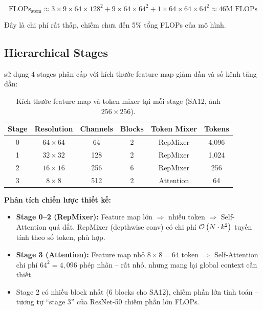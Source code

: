 \begin{equation}
    \text{FLOPs}_{\text{stem}} \approx 3 \times 9 \times 64 \times 128^2 + 9 \times 64 \times 64^2 + 1 \times 64 \times 64 \times 64^2 \approx 46\text{M FLOPs}
\end{equation}

\noindent Đây là chi phí rất thấp, chiếm chưa đến 5\% tổng FLOPs của mô hình.

\subsection{Hierarchical Stages}
\label{subsec:stages}

\fastvit{} sử dụng 4 stages phân cấp với kích thước feature map giảm dần và số kênh tăng dần:

\begin{table}[H]
\centering
\caption{Kích thước feature map và token mixer tại mỗi stage (SA12, ảnh $256 \times 256$).}
\label{tab:stage_detail}
\begin{tabular}{c c c c c c}
\toprule
\textbf{Stage} & \textbf{Resolution} & \textbf{Channels} & \textbf{Blocks} & \textbf{Token Mixer} & \textbf{Tokens} \\
\midrule
0 & $64 \times 64$ & 64 & 2 & RepMixer & 4{,}096 \\
1 & $32 \times 32$ & 128 & 2 & RepMixer & 1{,}024 \\
2 & $16 \times 16$ & 256 & 6 & RepMixer & 256 \\
3 & $8 \times 8$ & 512 & 2 & Attention & 64 \\
\bottomrule
\end{tabular}
\end{table}

\textbf{Phân tích chiến lược thiết kế:}
\begin{itemize}
    \item \textbf{Stage 0--2 (RepMixer):} Feature map lớn $\Rightarrow$ nhiều token $\Rightarrow$ Self-Attention quá đắt. RepMixer (depthwise conv) có chi phí $\mathcal{O}\left(N \cdot k^2\right)$ tuyến tính theo số token, phù hợp.
    
    \item \textbf{Stage 3 (Attention):} Feature map nhỏ $8 \times 8 = 64$ token $\Rightarrow$ Self-Attention chi phí $64^2 = 4{,}096$ phép nhân -- rất nhỏ, nhưng mang lại global context cần thiết.
    
    \item Stage 2 có nhiều block nhất (6 blocks cho SA12), chiếm phần lớn tính toán -- tương tự ``stage 3'' của ResNet-50 chiếm phần lớn FLOPs.
\end{itemize}

